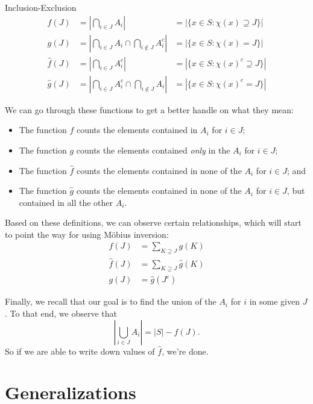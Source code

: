 \documentclass[12pt]{pom_thesis}
\begin{document}
\begin{chapter}{Inclusion-Exclusion}
\begin{align*}
f(J) &= \left| \bigcap_{i \in J} A_i\right| &= |\{x \in S: \chi(x) \supseteq J\}|\\
g(J) &= \left| \bigcap_{i \in J} A_i \cap \bigcap_{i \notin J} A_i^c\right| &= |\{x \in S: \chi(x) = J\}|\\
\hat{f}(J) &= \left| \bigcap_{i \in J} A_i^c\right| &= |\{x \in S: \chi(x)^c \supseteq J\}|\\
\hat{g}(J) &= \left|\bigcap_{i \in J} A_i^c \cap \bigcap_{i \notin J} A_i \right| &= |\{x \in S: \chi(x)^c = J\}|
\end{align*}

We can go through these functions to get a better handle on what they mean:
\begin{itemize}
\item The function $f$ counts the elements contained in $A_i$ for $i \in J$;
\item The function $g$ counts the elements contained \emph{only} in the $A_i$ for $i \in J$;
\item The function $\hat{f}$ counts the elements contained in none of the $A_i$ for $i \in J$; and
\item The function $\hat{g}$ counts the elements contained in none of the $A_i$ for $i \in J$, but contained in all the other $A_i$.
\end{itemize}
Based on these definitions, we can observe certain relationships, which will start to point the way for using M\"obius inversion:
\begin{align*}
f(J) &= \sum_{K \supseteq J} g(K)\\
\hat{f}(J) &= \sum_{K \supseteq J} \hat{g}(K)\\
g(J) &= \hat{g}(J^c)
\end{align*}

Finally, we recall that our goal is to find the union of the $A_i$ for $i$ in some given $J$. To that end, we observe that
\[
\left| \bigcup_{i \in J} A_i \right| = |S| - \hat{f}(J).
\]
So if we are able to write down values of $\hat{f}$, we're done.
\section{Generalizations}

\end{chapter}
\end{document}
